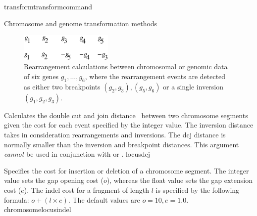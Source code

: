\begin{command}{transform}{transformcommand}
\begin{arguments}
\begin{argumentgroup}{Chromosome and genome transformation methods}
		   
		    \begin{figure}[!htbp]
		        \begin{center}
        		    \includegraphics[width=0.4\textwidth]{doc/figures/breakpointDis.pdf}
      		    \end{center}
		        \caption{Rearrangement calculations between chromosomal or genomic 
		        data of six genes $g_1, \ldots, g_6$, where the rearrangement events 
		        are detected as either two breakpoints $(g_2, g_3), (g_5, g_6)$
                    or a single inversion $(g_1, g_2, g_3)$.}
                \label{fig:distance}
		    \end{figure}
		
	        \begin{description}                 
                            
                    {Calculates the double cut and join
                    distance~\cite{yancopoulosetal2005}
                    between two chromosome segments given the cost for each
                    event specified by the integer value. The inversion distance
                    takes in consideration rearrangements and
                    inversions. The dcj distance is normally smaller than
                    the inversion and breakpoint distances.
                    This argument \emph{cannot} be used in conjunction with
                     or
                    .} 
                    {locusdcj}
                        
                    {Specifies the cost for insertion or deletion of a
                    chromosome segment. The integer value sets the gap opening
                    cost ($o$), whereas the float value sets the gap extension
                    cost ($e$).  The indel cost for a fragment of length $l$ is
                    specified by the following formula:
                        $o + (l \times e)$. The default values are $o=10, e=1.0$.}
                    {chromosomelocusindel}
                        

\end{description}
\end{argumentgroup}
\end{arguments}
\end{command}
